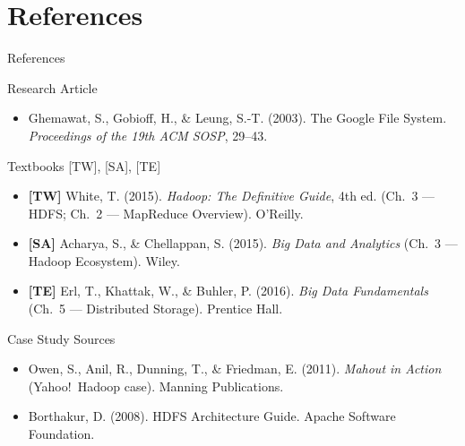 \documentclass[aspectratio=169,10pt]{beamer}
\begin{document}
\section*{References}

\begin{frame}{References}
  \begin{block}{Research Article}
    \begin{itemize}
      \item Ghemawat, S., Gobioff, H., \& Leung, S.-T. (2003).
            The Google File System.
            \textit{Proceedings of the 19th ACM SOSP}, 29--43.
    \end{itemize}
  \end{block}
  \vspace{4pt}
  \begin{block}{Textbooks \textmd{[TW], [SA], [TE]}}
    \begin{itemize}
      \item \textbf{[TW]} White, T. (2015).
            \textit{Hadoop: The Definitive Guide}, 4th ed.
            (Ch.~3 — HDFS; Ch.~2 — MapReduce Overview). O'Reilly.
      \item \textbf{[SA]} Acharya, S., \& Chellappan, S. (2015).
            \textit{Big Data and Analytics}
            (Ch.~3 — Hadoop Ecosystem). Wiley.
      \item \textbf{[TE]} Erl, T., Khattak, W., \& Buhler, P. (2016).
            \textit{Big Data Fundamentals}
            (Ch.~5 — Distributed Storage). Prentice Hall.
    \end{itemize}
  \end{block}
  \vspace{4pt}
  \begin{block}{Case Study Sources}
    \begin{itemize}
      \item Owen, S., Anil, R., Dunning, T., \& Friedman, E. (2011).
            \textit{Mahout in Action} (Yahoo!\ Hadoop case).
            Manning Publications.
      \item Borthakur, D. (2008).
            HDFS Architecture Guide. Apache Software Foundation.
    \end{itemize}
  \end{block}
\end{frame}
\end{document}
